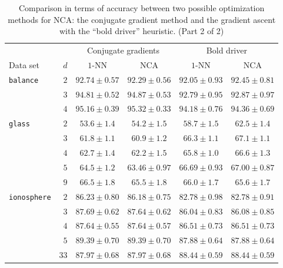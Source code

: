   \begin{table}
    \centering\begin{tabular}{lrcccc}
      \toprule
      &     & \multicolumn{2}{c}{Conjugate gradients}  & \multicolumn{2}{c}{Bold driver}\\
      \cmidrule(r){3-4} \cmidrule(r){5-6}
      Data set & $d$ & $1$-NN & NCA & $1$-NN & NCA \\
      \midrule
	\texttt{balance}&$2$&$92.74 \pm 0.57$&$92.29 \pm 0.56$&$92.05 \pm 0.93$&$92.45 \pm 0.81$\\ 
	&$3$&$94.81 \pm 0.52$&$94.87 \pm 0.53$&$92.79 \pm 0.95$&$92.87 \pm 0.97$\\ 
	&$4$&$95.16 \pm 0.39$&$95.32 \pm 0.33$&$94.18 \pm 0.76$&$94.36 \pm 0.69$\\ 
	\midrule
	\texttt{glass}&$2$&$53.6 \pm 1.4$&$54.2 \pm 1.5$&$58.7 \pm 1.5$&$62.5 \pm 1.4$\\ 
	&$3$&$61.8 \pm 1.1$&$60.9 \pm 1.2$&$66.3 \pm 1.1$&$67.1 \pm 1.1$\\ 
	&$4$&$62.7 \pm 1.4$&$62.2 \pm 1.5$&$65.8 \pm 1.0$&$66.6 \pm 1.3$\\ 
	&$5$&$64.5 \pm 1.2$&$63.46 \pm 0.97$&$66.69 \pm 0.93$&$67.00 \pm 0.87$\\ 
	&$9$&$66.5 \pm 1.8$&$65.5 \pm 1.8$&$66.0 \pm 1.7$&$65.6 \pm 1.7$\\ 
	\midrule
	\texttt{ionosphere}&$2$&$86.23 \pm 0.80$&$86.18 \pm 0.75$&$82.78 \pm 0.98$&$82.78 \pm 0.91$\\ 
	&$3$&$87.69 \pm 0.62$&$87.64 \pm 0.62$&$86.04 \pm 0.83$&$86.08 \pm 0.85$\\ 
	&$4$&$87.64 \pm 0.55$&$87.64 \pm 0.57$&$86.51 \pm 0.73$&$86.51 \pm 0.73$\\ 
	&$5$&$89.39 \pm 0.70$&$89.39 \pm 0.70$&$87.88 \pm 0.64$&$87.88 \pm 0.64$\\ 
	&$33$&$87.97 \pm 0.68$&$87.97 \pm 0.68$&$88.44 \pm 0.59$&$88.44 \pm 0.59$\\ 
      \bottomrule
    \end{tabular}
  \caption[Accuracy for NCA optimized with conjugate gradient method and gradient ascent with ``bold driver'' heuristic (part 1 of 2)]{Comparison in terms of accuracy between two possible optimization methods for NCA: the conjugate gradient method and the gradient ascent with the ``bold driver'' heuristic. (Part 2 of 2)}
  \label{table:comp-opts-1}
  \end{table}

